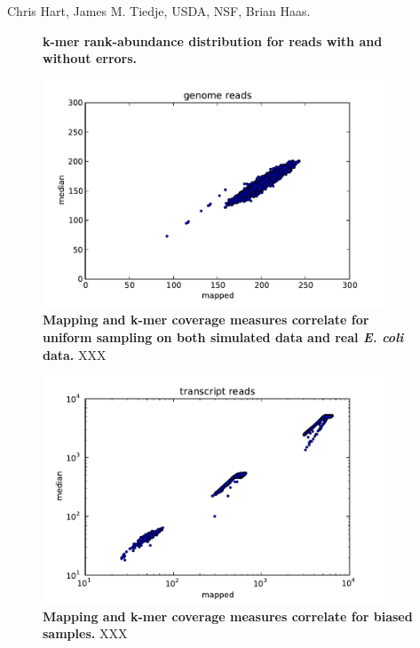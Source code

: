 \documentclass[10pt,draft]{article}
\begin{document}
Chris Hart, James M. Tiedje, USDA, NSF, Brian Haas.



\begin{figure}
\caption{
{\bf k-mer rank-abundance distribution for reads with and without errors.}}
\label{fig:rankabund}
\end{figure}

\begin{figure}[!ht]
\begin{center}
\includegraphics[width=4in]{diginorm-fig1a.pdf}
\end{center}
\caption{
{\bf Mapping and k-mer coverage measures correlate for uniform sampling on
both simulated data and real {\em E. coli} data.}
XXX
}
\label{fig:random}
\end{figure}


\begin{figure}[!ht]
\begin{center}
\includegraphics[width=4in]{diginorm-fig2a.pdf}
\end{center}
\caption{
{\bf Mapping and k-mer coverage measures correlate for biased samples.}
XXX
}
\label{fig:transcripts}
\end{figure}
\end{document}
